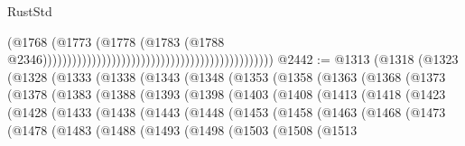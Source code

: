 \begin{lexlean}{RustStd}
\begin{coremodule}
{\begin{coremodule}
{{{{{{{{{{{{{{{{{{{{{{{{{{{{{{{{{{{{{{{{{{{{{{{{{{{{{{{{{{{{                                                                                        (@1768
                                                                                          (@1773
                                                                                            (@1778
                                                                                              (@1783
                                                                                                (@1788
                                                                                                  @2346)))))))))))))))))))))))))))))))))))))))))))))))
@2442 := @1313
    (@1318
      (@1323
        (@1328
          (@1333
            (@1338
              (@1343
                (@1348
                  (@1353
                    (@1358
                      (@1363
                        (@1368
                          (@1373
                            (@1378
                              (@1383
                                (@1388
                                  (@1393
                                    (@1398
                                      (@1403
                                        (@1408
                                          (@1413
                                            (@1418
                                              (@1423
                                                (@1428
                                                  (@1433
                                                    (@1438
                                                      (@1443
                                                        (@1448
                                                          (@1453
                                                            (@1458
                                                              (@1463
                                                                (@1468
                                                                  (@1473
                                                                    (@1478
                                                                      (@1483
                                                                        (@1488
                                                                          (@1493
                                                                            (@1498
                                                                              (@1503
                                                                                (@1508
                                                                                  (@1513
}}}}}}}}}}}}}}}}}}}}}}}}}}}}}}}}}}}}}}}}}}}}}}}}}}}}}}}}}}}}
\end{coremodule}}
\end{coremodule}
\end{lexlean}
